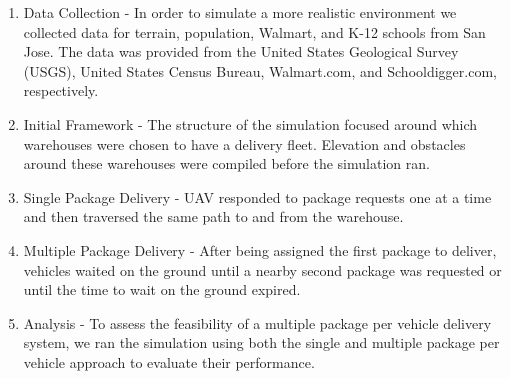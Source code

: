 \justify
\begin{enumerate}
\item{Data Collection - In order to simulate a more realistic environment we collected data for terrain, population, Walmart, and K-12 schools from San Jose. The data was provided from the United States Geological Survey (USGS), United States Census Bureau, Walmart.com, and Schooldigger.com, respectively.}\\

\vspace{7mm}

\item{Initial Framework - The structure of the simulation focused around which warehouses were chosen to have a delivery fleet. Elevation and obstacles around these warehouses were compiled before the simulation ran.}

\vspace{7mm}

\item{Single Package Delivery - UAV responded to package requests one at a time and then traversed the same path to and from the warehouse.}

\vspace{7mm}

\item{Multiple Package Delivery - After being assigned the first package to deliver, vehicles waited on the ground until a nearby second package was requested or until the time to wait on the ground expired.}

\vspace{7mm}

\item{Analysis - To assess the feasibility of a multiple package per vehicle delivery system, we ran the simulation using both the single and multiple package per vehicle approach to evaluate their performance.}
\end{enumerate}
